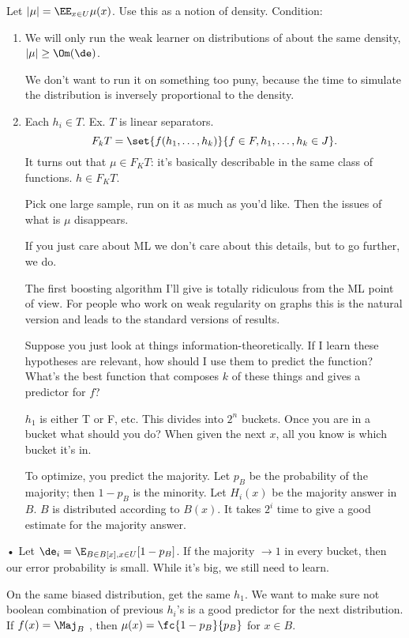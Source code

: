Let $|\mu| = \EE_{x\in U} \mu(x)$. Use this as a notion of density. %
Condition: 
\begin{enumerate}
\item
We will only run the weak learner on distributions of about the same density, $|\mu|\ge \Om(\de)$.

We don't want to run it on something too puny, because the time to simulate the distribution is inversely proportional to the density.
\item
Each $h_i\in T$. Ex. $T$ is linear separators. 
$$
F_k T = \set{f(h_1,\ldots, h_k)}{f\in F, h_1,\ldots, h_k\in J}.
$$
It turns out that $\mu\in F_KT$: it's basically describable in the same class of functions. $h\in F_KT$.

Pick one large sample, run on it as much as you'd like. Then the issues of what is $\mu$ disappears. 

If you just care about ML we don't care about this details, but to go further, we do.

The first boosting algorithm I'll give is totally ridiculous from the ML point of view. For people who work on weak regularity on graphs this is the natural version and leads to the standard versions of results.

Suppose you just look at things information-theoretically. If I learn these hypotheses are relevant, how should I use them to predict the function? What's the best function that composes $k$ of these things and gives a predictor for $f$? 

$h_1$ is either T or F, etc. This divides into $2^n$ buckets. Once you are in a bucket what should you do? When given the next $x$, all you know is which bucket it's in.

To optimize, you predict the majority. Let $p_B$ be the probability of the majority; then $1-p_B$ is the minority. Let $H_i(x)$ be the majority answer in $B$.
$B$ is distributed according to $B(x)$. 
It takes $2^i$ time to give a good estimate for the majority answer.
\end{enumerate}•
Let $\de_i = \E_{B\in B[x], x\in U} [1-p_B]$. If the majority $\to 1$ in every bucket, then our error probability is small. While it's big, we still need to learn.

On the same biased distribution, get the same $h_1$. We want to make sure not boolean combination of previous $h_i$'s is a good predictor for the next distribution. 
If $f(x)=\Maj_B$ , then $\mu(x) = \fc{1-p_B}{p_B}$ for $x\in B$. 

